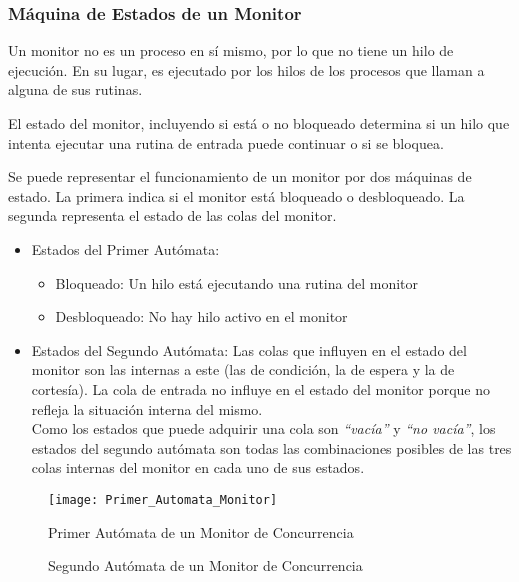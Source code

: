 \subsubsection{Máquina de Estados de un Monitor}
Un monitor no es un proceso en sí mismo, por lo que no tiene un hilo de
ejecución. En su lugar, es ejecutado por los hilos de los procesos que llaman a
alguna de sus rutinas.

El estado del monitor, incluyendo si está o no bloqueado determina si un
hilo que intenta ejecutar una rutina de entrada puede continuar o si se bloquea.

Se puede representar el funcionamiento de un monitor por dos máquinas de
estado. La primera indica si el monitor está bloqueado o desbloqueado. La
segunda representa el estado de las colas del monitor.
\begin{itemize}
    \item Estados del Primer Autómata:
    \begin{itemize}
        \item Bloqueado: Un hilo está ejecutando una rutina del monitor
        \item Desbloqueado: No hay hilo activo en el monitor
    \end{itemize}
    \item Estados del Segundo Autómata: Las colas que influyen en el estado del
    monitor son las internas a este (las de condición, la de espera y la de
    cortesía). La cola de entrada no influye en el estado del monitor porque no
    refleja la situación interna del mismo.\\
    Como los estados que puede adquirir una cola son \textit{“vacía”} y
    \textit{“no vacía”}, los estados del segundo autómata son todas las
    combinaciones posibles de las tres colas internas del monitor en cada uno de
    sus estados.
\end{itemize}

\begin{figure}[H]
  \centering
  \texttt{[image: Primer\_Automata\_Monitor]}
  \caption{Primer Autómata de un Monitor de Concurrencia}
  \label{fig:automata_monitor01}
\end{figure}

\begin{figure}[H]
  \centering
  \caption{Segundo Autómata de un Monitor de Concurrencia}
  \label{fig:automata_monitor02}
\end{figure}

